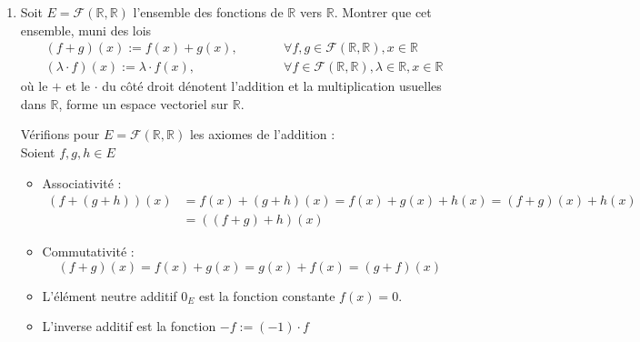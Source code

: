 \documentclass[a4paper, 10pt]{report}
\begin{document}
	\begin{enumerate}[label=\arabic*.]
		\item Soit $E = \mathcal{F}(\mathbb{R}, \mathbb{R})$
		l'ensemble des fonctions de $\mathbb{R}$ vers $\mathbb{R}$.
		Montrer que cet ensemble, muni des lois
		\[
			\begin{aligned}
				&(f + g)(x) := f(x) + g(x),
				\qquad
				& &\forall f, g \in \mathcal{F}(\mathbb{R}, \mathbb{R}),
				x \in \mathbb{R}\\
				&(\lambda \cdot f)(x) := \lambda \cdot f(x),
				\qquad
				& &\forall f \in \mathcal{F}(\mathbb{R}, \mathbb{R}),
				\lambda \in \mathbb{R}, x \in \mathbb{R}
			\end{aligned}
		\]
		où le $+$ et le $\cdot$ du côté droit dénotent l'addition
		et la multiplication usuelles dans $\mathbb{R}$, forme un
		espace vectoriel sur $\mathbb{R}$.
		
		\colorbox{solution}
		{
			\begin{minipage}{0.9\textwidth}
				Vérifions pour $E = \mathcal{F}(\mathbb{R}, \mathbb{R})$
				les axiomes de l'addition :\\
				Soient $f, g, h \in E$
				\begin{itemize}
					\item Associativité : 
						\[
							\begin{aligned}
								(f + (g + h))(x)
								&= f(x) + (g + h)(x)
								= f(x) + g(x) + h(x)
								= (f + g)(x) + h(x)\\
								&= ((f + g) + h)(x)
							\end{aligned}
						\]
					\item Commutativité :
						\[
							(f + g)(x)
							= f(x) + g(x)
							= g(x) + f(x)
							= (g + f)(x)
						\]
					\item L'élément neutre additif $0_E$ est la fonction
					constante $f(x) = 0$.
					\item L'inverse additif est la fonction
					$-f := (-1) \cdot f$
				\end{itemize}
				

\end{minipage}}
\end{enumerate}
\end{document}
